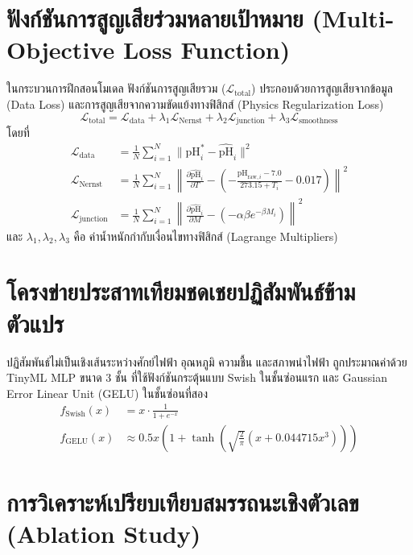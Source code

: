 \section{ฟังก์ชันการสูญเสียร่วมหลายเป้าหมาย (Multi-Objective Loss Function)}

ในกระบวนการฝึกสอนโมเดล ฟังก์ชันการสูญเสียรวม ($\mathcal{L}_{\text{total}}$) ประกอบด้วยการสูญเสียจากข้อมูล (Data Loss) และการสูญเสียจากความขัดแย้งทางฟิสิกส์ (Physics Regularization Loss)
\begin{equation}
\mathcal{L}_{\text{total}} = \mathcal{L}_{\text{data}} + \lambda_1 \mathcal{L}_{\text{Nernst}} + \lambda_2 \mathcal{L}_{\text{junction}} + \lambda_3 \mathcal{L}_{\text{smoothness}}
\end{equation}
โดยที่
\begin{align}
\mathcal{L}_{\text{data}} &= \frac{1}{N}\sum_{i=1}^N \|\text{pH}_i^* - \widehat{\text{pH}}_i\|^2 \\
\mathcal{L}_{\text{Nernst}} &= \frac{1}{N}\sum_{i=1}^N \left\|\frac{\partial \widehat{\text{pH}}_i}{\partial T} - \left(-\frac{\text{pH}_{\text{raw},i} - 7.0}{273.15 + T_i} - 0.017\right)\right\|^2 \\
\mathcal{L}_{\text{junction}} &= \frac{1}{N}\sum_{i=1}^N \left\|\frac{\partial \widehat{\text{pH}}_i}{\partial M} - \left(-\alpha\beta e^{-\beta M_i}\right)\right\|^2
\end{align}
และ $\lambda_1, \lambda_2, \lambda_3$ คือ ค่าน้ำหนักกำกับเงื่อนไขทางฟิสิกส์ (Lagrange Multipliers)

\section{โครงข่ายประสาทเทียมชดเชยปฏิสัมพันธ์ข้ามตัวแปร}

ปฏิสัมพันธ์ไม่เป็นเชิงเส้นระหว่างศักย์ไฟฟ้า อุณหภูมิ ความชื้น และสภาพนำไฟฟ้า ถูกประมาณค่าด้วย TinyML MLP ขนาด 3 ชั้น ที่ใช้ฟังก์ชันกระตุ้นแบบ Swish ในชั้นซ่อนแรก และ Gaussian Error Linear Unit (GELU) ในชั้นซ่อนที่สอง
\begin{align}
f_{\text{Swish}}(x) &= x \cdot \frac{1}{1 + e^{-x}} \\
f_{\text{GELU}}(x) &\approx 0.5x\left(1 + \tanh\left(\sqrt{\frac{2}{\pi}}\left(x + 0.044715x^3\right)\right)\right)
\end{align}

\section{การวิเคราะห์เปรียบเทียบสมรรถนะเชิงตัวเลข (Ablation Study)}

